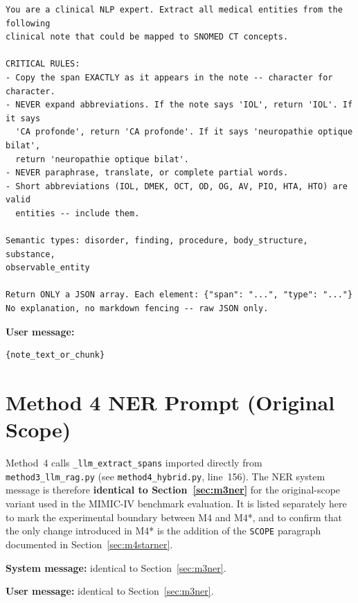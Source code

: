 \documentclass{EPL-master-thesis-covers-EN}
\begin{document}
    \begin{verbatim}
You are a clinical NLP expert. Extract all medical entities from the following
clinical note that could be mapped to SNOMED CT concepts.

CRITICAL RULES:
- Copy the span EXACTLY as it appears in the note -- character for character.
- NEVER expand abbreviations. If the note says 'IOL', return 'IOL'. If it says
  'CA profonde', return 'CA profonde'. If it says 'neuropathie optique bilat',
  return 'neuropathie optique bilat'.
- NEVER paraphrase, translate, or complete partial words.
- Short abbreviations (IOL, DMEK, OCT, OD, OG, AV, PIO, HTA, HTO) are valid
  entities -- include them.

Semantic types: disorder, finding, procedure, body_structure, substance,
observable_entity

Return ONLY a JSON array. Each element: {"span": "...", "type": "..."}
No explanation, no markdown fencing -- raw JSON only.
    \end{verbatim}

    \medskip
    \noindent\textbf{User message:}

    \begin{verbatim}
{note_text_or_chunk}
    \end{verbatim}

    \section{Method 4 NER Prompt (Original Scope)}
    \label{sec:m4ner}

    Method~4 calls \texttt{\_llm\_extract\_spans} imported directly from
    \texttt{method3\_llm\_rag.py} (see \texttt{method4\_hybrid.py}, line~156). The NER
    system message is therefore \textbf{identical to Section~\ref{sec:m3ner}} for the
    original-scope variant used in the MIMIC-IV benchmark evaluation. It is listed
    separately here to mark the experimental boundary between M4 and M4*, and to confirm
    that the only change introduced in M4* is the addition of the \texttt{SCOPE} paragraph
    documented in Section~\ref{sec:m4starner}.

    \medskip
    \noindent\textbf{System message:} identical to Section~\ref{sec:m3ner}.

    \medskip
    \noindent\textbf{User message:} identical to Section~\ref{sec:m3ner}.
\end{document}
